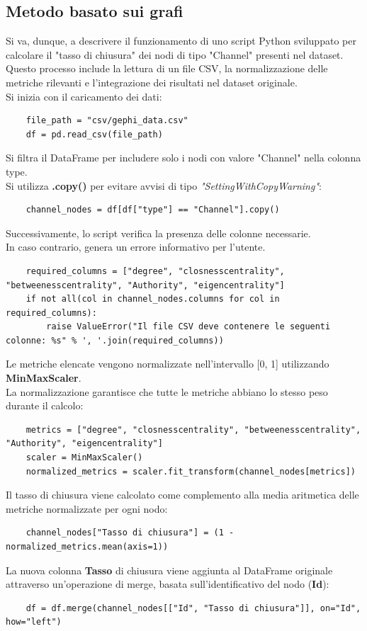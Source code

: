 \documentclass[12pt]{article}
\begin{document}
	\subsection{Metodo basato sui grafi}
	Si va, dunque, a descrivere il funzionamento di uno script Python sviluppato per calcolare il "tasso di chiusura" dei nodi di tipo "Channel" presenti nel dataset.\\ Questo processo include la lettura di un file CSV, la normalizzazione delle metriche rilevanti e l'integrazione dei risultati nel dataset originale.\\
	Si inizia con il caricamento dei dati:
	\begin{lstlisting}
	file_path = "csv/gephi_data.csv"
	df = pd.read_csv(file_path)
	\end{lstlisting}
	Si filtra il DataFrame per includere solo i nodi con valore "Channel" nella colonna type.\\ 
	Si utilizza \textbf{.copy()} per evitare avvisi di tipo \textit{"SettingWithCopyWarning"}:
	\begin{lstlisting}
	channel_nodes = df[df["type"] == "Channel"].copy()
	\end{lstlisting}
	Successivamente, lo script verifica la presenza delle colonne necessarie.\\
	In caso contrario, genera un errore informativo per l'utente.
	\begin{lstlisting}
	required_columns = ["degree", "closnesscentrality", "betweenesscentrality", "Authority", "eigencentrality"]
	if not all(col in channel_nodes.columns for col in required_columns):
		raise ValueError("Il file CSV deve contenere le seguenti colonne: %s" % ', '.join(required_columns))
	\end{lstlisting}
	Le metriche elencate vengono normalizzate nell'intervallo [0, 1] utilizzando \textbf{MinMaxScaler}. \\La normalizzazione garantisce che tutte le metriche abbiano lo stesso peso durante il calcolo:
	\begin{lstlisting}
	metrics = ["degree", "closnesscentrality", "betweenesscentrality", "Authority", "eigencentrality"]
	scaler = MinMaxScaler()
	normalized_metrics = scaler.fit_transform(channel_nodes[metrics])
	\end{lstlisting}
	Il tasso di chiusura viene calcolato come complemento alla media aritmetica delle metriche normalizzate per ogni nodo:
	\begin{lstlisting}
	channel_nodes["Tasso di chiusura"] = (1 - normalized_metrics.mean(axis=1))
	\end{lstlisting}
	La nuova colonna \textbf{Tasso} di chiusura viene aggiunta al DataFrame originale attraverso un'operazione di merge, basata sull'identificativo del nodo (\textbf{Id}):
	\begin{lstlisting}
	df = df.merge(channel_nodes[["Id", "Tasso di chiusura"]], on="Id", how="left")
	\end{lstlisting}
\end{document}
